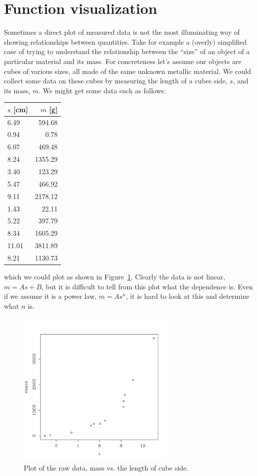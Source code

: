 \documentclass{article}
\begin{document}
\section{Function visualization}
Sometimes a direct plot of measured data is not the most illuminating way of showing relationships between quantities.  Take for example a (overly) simplified case of trying to understand the relationship between the ``size'' of an object of a particular material and its mass.  For concreteness let's assume our objects are cubes of various sizes, all made of the same unknown metallic material.  We could collect some data on these cubes by measuring the length of a cubes side, $s$, and its mass, $m$.  We might get some data such as follows:

\begin{center}
  \begin{tabular}{ l | r  }
$s$ [cm] & $m$ [g]\\
    \hline
6.49  &	594.68 \\
0.94  &	0.78 \\
6.07  &	469.48 \\
8.24  &	1355.29 \\
3.40  &	123.29 \\
5.47   &	466.92\\
9.11   &	2178.12  \\
1.43   &	22.11   \\
5.22   &	397.79  \\
8.34   &	1605.29 \\
11.01 &	3811.89  \\
8.21   &	1130.73 \\
  \end{tabular}
\end{center}

which we could plot as shown in Figure~\ref{fig:mvss}.  Clearly the data is not linear, $m = As + B$, but it is difficult to tell from this plot what the dependence is.  Even if we assume it is a power law, $m = As^n$, it is hard to look at this and determine what $n$ is.

\begin{figure}
\begin{centering}
\includegraphics[width=3in]{../images/mass-v-s.pdf}
\caption{Plot of the raw data, mass vs. the length of cube side.}
\label{fig:mvss}
\end{centering}
\end{figure}
\end{document}
